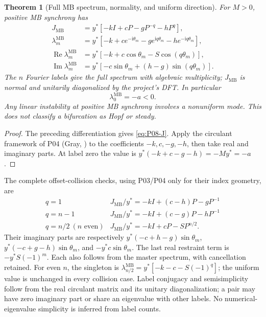 \documentclass[11pt]{article}
\let\OriginalCite\cite
\renewcommand{\cite}[2][]{%
  \textcolor{CitationRed}{%
    \if\relax\detokenize{#1}\relax
      \OriginalCite{#2}%
    \else
      \OriginalCite[#1]{#2}%
    \fi}}
\newcommand{\ii}{\mathrm{i}}
\newcommand{\MB}{\mathrm{MB}}
\DeclareMathOperator{\Ree}{Re}
\DeclareMathOperator{\Imm}{Im}
\newtheorem{theorem}{Theorem}[section]
\theoremstyle{definition}
\theoremstyle{remark}
\begin{document}
\begin{theorem}[Full MB spectrum, normality, and uniform direction]
\label{thm:P08-spectrum}
For $M>0$, positive MB synchrony has
\begin{align}
 J_{\MB}&=y^*[-kI+cP-gP^{-q}-hP^q],\label{eq:P08-J}\\
 \lambda_m^{\MB}&=y^*[-k+ce^{-\ii\theta_m}-ge^{\ii q\theta_m}
                           -he^{-\ii q\theta_m}],\label{eq:P08-spectrum}\\
 \Ree\lambda_m^{\MB}&=y^*[-k+c\cos\theta_m-S\cos(q\theta_m)],
 \label{eq:P08-real}\\
 \Imm\lambda_m^{\MB}&=y^*[-c\sin\theta_m+(h-g)\sin(q\theta_m)].
 \label{eq:P08-imag}
\end{align}
The $n$ Fourier labels give the full spectrum with algebraic multiplicity;
$J_{\MB}$ is normal and unitarily diagonalized by the project's DFT.
In particular
\begin{equation}
 \boxed{\lambda_0^{\MB}=-a<0.}\label{eq:P08-uniform}
\end{equation}
Any linear instability at positive MB synchrony involves a nonuniform
mode. This does not classify a bifurcation as Hopf or steady.
\end{theorem}
\begin{proof}
The preceding differentiation gives \eqref{eq:P08-J}. Apply the
circulant framework of P04 (Gray, \cite[Theorem~3.1]{Gray2006})
to the coefficients $-k,c,-g,-h$, then take real and imaginary parts.
At label zero the value is $y^*(-k+c-g-h)=-My^*=-a$.
\end{proof}

The complete offset-collision checks, using P03/P04 only for their
index geometry, are
\[
\begin{array}{c|l}
q=1&J_{\MB}/y^*=-kI+(c-h)P-gP^{-1}\\
q=n-1&J_{\MB}/y^*=-kI+(c-g)P-hP^{-1}\\
q=n/2\ (n\text{ even})&J_{\MB}/y^*=-kI+cP-SP^{n/2}.
\end{array}
\]
Their imaginary parts are respectively
$y^*(-c+h-g)\sin\theta_m$, $y^*(-c+g-h)\sin\theta_m$, and
$-y^*c\sin\theta_m$. The last real restraint term is $-y^*S(-1)^m$.
Each also follows from the master spectrum, with cancellation retained.
For even $n$, the singleton is
$\lambda_{n/2}^{\MB}=y^*[-k-c-S(-1)^q]$; the uniform value is
unchanged in every collision case. Label conjugacy and semisimplicity
follow from the real circulant matrix and its unitary diagonalization;
a pair may have zero imaginary part or share an eigenvalue with other
labels. No numerical-eigenvalue simplicity is inferred from label counts.
\end{document}
